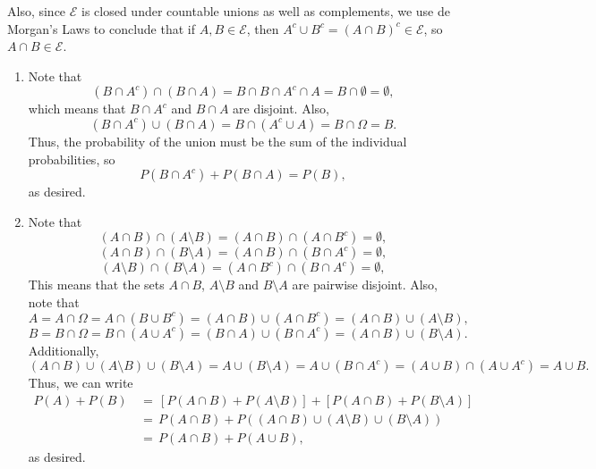 \documentclass[10pt]{article}
\newcounter{prob}
\begin{document}
        Also, since $\mathcal{E}$ is closed under countable unions as well as
        complements, we use de Morgan's Laws to conclude that if $A, B \in
        \mathcal{E}$, then $A^c \cup B^c = (A \cap B)^c \in \mathcal{E}$,
        so $A \cap B \in \mathcal{E}$.
        \begin{enumerate}
                \item Note that \[
                        (B \cap A^c) \cap (B \cap A) = B \cap B \cap A^c \cap A
                        = B \cap \emptyset = \emptyset,
                \] which means that $B \cap A^c$ and $B \cap A$ are disjoint.
                Also, \[
                        (B\cap A^c) \cup (B \cap A) = B \cap (A^c \cup A) = 
                        B \cap \Omega = B.
                \] 
                Thus, the probability of the union must be the sum of the individual
                probabilities, so \[
                        P(B \cap A^c) + P(B \cap A) = P(B),
                \] as desired.

                \item Note that \[
                        (A \cap B) \cap (A \setminus B) = (A \cap B) \cap (A \cap
                        B^c) = \emptyset,
                \]
                \[
                        (A \cap B) \cap (B \setminus A) = (A \cap B) \cap (B \cap
                        A^c) = \emptyset,
                \] 
                \[
                        (A \setminus B) \cap (B \setminus A) = (A \cap B^c) \cap (B
                        \cap A^c) = \emptyset,
                \]
                This means that the sets $A\cap B$, $A\setminus B$ and $B\setminus
                A$ are pairwise disjoint. 
                Also, note that \[
                        A = A \cap \Omega = A \cap (B \cup B^c) = (A \cap B) \cup (A
                        \cap B^c) = (A \cap B) \cup (A \setminus B),
                \] \[
                        B = B \cap \Omega = B \cap (A \cup A^c) = (B \cap A) \cup (B
                        \cap A^c) = (A \cap B) \cup (B \setminus A).
                \] 
                Additionally, \[
                        (A \cap B) \cup (A \setminus B) \cup (B \setminus A) = A
                        \cup (B \setminus A) = A \cup (B \cap A^c) = (A \cup B) \cap
                        (A \cup A^c) = A \cup B.
                \] 
                Thus, we can write 
                \begin{align*}
                P(A) + P(B) \,&=\, \left[P(A\cap B) + P(A\setminus B)\right] + 
                            \left[P(A \cap B) + P(B \setminus A)\right] \\
                        \,&=\, P(A \cap B) + P((A \cap B) \cup (A \setminus B) 
                            \cup (B\setminus A)) \\
                        \,&=\, P(A \cap B) + P(A \cup B),
                \end{align*}
                as desired.


\end{enumerate}
\end{document}
